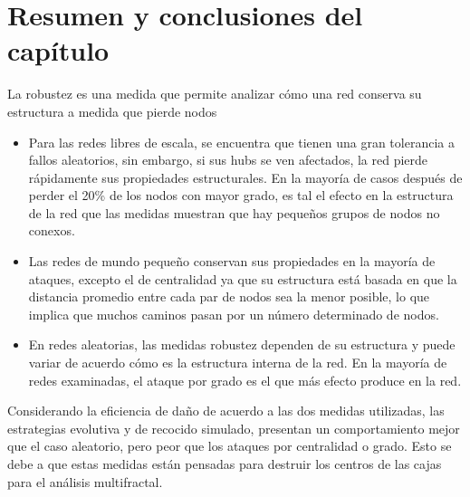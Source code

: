 \section{Resumen y conclusiones del capítulo}

La robustez es una medida que permite analizar cómo una red conserva su estructura a medida que pierde nodos

\begin{itemize}
    \item Para las redes libres de escala, se encuentra que tienen una gran tolerancia a fallos aleatorios, sin embargo, si sus hubs se ven afectados, la red pierde rápidamente sus propiedades estructurales. En la mayoría de casos después de perder el 20\% de los nodos con mayor grado, es tal el efecto en la estructura de la red que las medidas muestran que hay pequeños grupos de nodos no conexos.
    \item Las redes de mundo pequeño conservan sus propiedades en la mayoría de ataques, excepto el de centralidad ya que su estructura está basada en que la distancia promedio entre cada par de nodos sea la menor posible, lo que implica que muchos caminos pasan por un número determinado de nodos.
    \item En redes aleatorias, las medidas robustez dependen de su estructura y puede variar de acuerdo cómo es la estructura interna de la red. En la mayoría de redes examinadas, el ataque por grado es el que más efecto produce en la red.
\end{itemize}

Considerando la eficiencia de daño de acuerdo a las dos medidas utilizadas, las estrategias evolutiva y de recocido simulado, presentan un comportamiento mejor que el caso aleatorio, pero peor que los ataques por centralidad o grado. Esto se debe a que estas medidas están pensadas para destruir los centros de las cajas para el análisis multifractal.